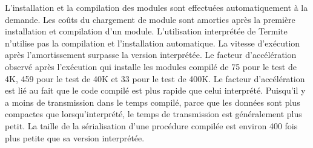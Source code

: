L'installation et la compilation des modules sont effectuées automatiquement
à la demande.  Les coûts du chargement de module sont amorties après
la première installation et compilation d'un module. L'utilisation interprétée
de Termite n'utilise pas la compilation et l'installation automatique.  La
vitesse d'exécution après l'amortissement surpasse la version interprétée.  Le
facteur d'accélération observé après l'exécution qui installe les modules compilé de 75 pour
le test de 4K, 459 pour le test de 40K et 33 pour le test de 400K.  Le facteur
d'accélération est lié au fait que le code compilé est plus rapide que celui
interprété.  Puisqu'il y a moins de transmission dans le temps compilé, parce
que les données sont plus compactes que lorsqu'interprété, le temps de
transmission est généralement plus petit. La taille de la sérialisation d'une
procédure compilée est environ 400 fois plus petite que sa version interprétée.


